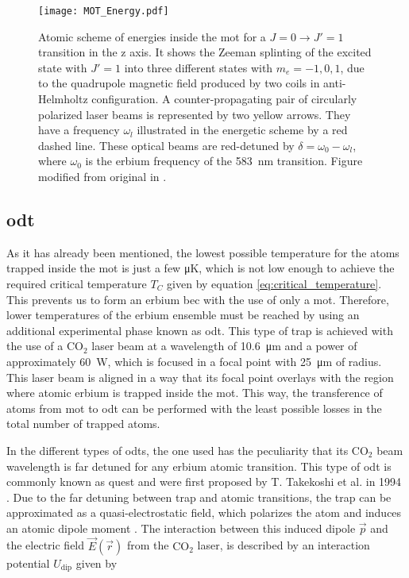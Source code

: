 \begin{figure}[!htbp]\centering
	\texttt{[image: MOT\_Energy.pdf]}
	\caption[Atomic scheme of energies inside the \ac{mot} for a $J=0 \arrowvert J'=1$ transition in the z axis]{Atomic scheme of energies inside the \ac{mot} for a $J=0 \rightarrow J'=1$ transition in the z axis. It shows the Zeeman splinting of the excited state with $J'=1$ into three different states with $m_e = -1, 0, 1$, due to the quadrupole magnetic field produced by two coils in anti-Helmholtz configuration. A counter-propagating pair of circularly polarized laser beams is represented by two yellow arrows. They have a frequency $\omega_l$ illustrated in the energetic scheme by a red dashed line. These optical beams are red-detuned by $\delta = \omega_0 - \omega_l$, where $\omega_0$ is the erbium frequency of the \SI{583}{\nano\meter} transition. Figure modified from original in \cite{Metcalf1999}.}\label{fig:MOT_Energy}
\end{figure}

\subsection{\Acl{odt}}

As it has already been mentioned, the lowest possible temperature for the atoms trapped inside the \ac{mot} is just a few \si{\micro\kelvin}, which is not low enough to achieve the required critical temperature $T_C$ given by equation \eqref{eq:critical_temperature}. This prevents us to form an erbium \acl{bec} with the use of only a \acl{mot}. Therefore, lower temperatures of the erbium ensemble must be reached by using an additional experimental phase known as \Acf{odt}. This type of trap is achieved with the use of a $\text{CO}_2$ laser beam at a wavelength of \SI{10.6}{\micro\meter} and a power of approximately \SI{60}{\watt}, which is focused in a focal point with \SI{25}{\micro\meter} of radius. This laser beam is aligned in a way that its focal point overlays with the region where atomic erbium is trapped inside the \ac{mot}. This way, the transference of atoms from \ac{mot} to \ac{odt} can be performed with the least possible losses in the total number of trapped atoms.

In the different types of \acp{odt}, the one used has the peculiarity that its $\text{CO}_2$ beam wavelength is far detuned for any erbium atomic transition. This type of \ac{odt} is commonly known as \Acf{quest} and were first proposed by T. Takekoshi et al. in 1994 \cite{Takekoshi1995}. Due to the far detuning between trap and atomic transitions, the trap can be approximated as a quasi-electrostatic field, which polarizes the atom and induces an atomic dipole moment \cite{Grimm2000}. The interaction between this induced dipole $\vec{p}$ and the electric field $\vec{E}(\vec{r})$ from the $\text{CO}_2$ laser, is described by an interaction potential $U_{\text{dip}}$ given by

